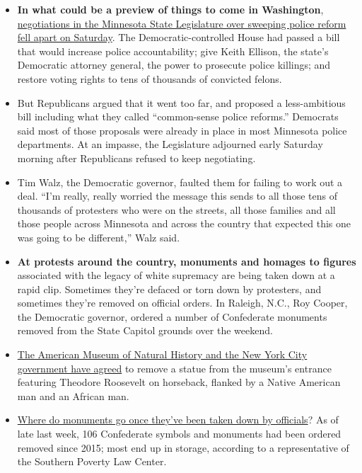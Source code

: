 \begin{itemize}
\item
  \textbf{In what could be a preview of things to come in Washington},
  \href{https://www.nytimes3xbfgragh.onion/2020/06/20/us/minnesota-police-george-floyd.html}{negotiations
  in the Minnesota State Legislature over sweeping police reform fell
  apart on Saturday}. The Democratic-controlled House had passed a bill
  that would increase police accountability; give Keith Ellison, the
  state's Democratic attorney general, the power to prosecute police
  killings; and restore voting rights to tens of thousands of convicted
  felons.
\item
  But Republicans argued that it went too far, and proposed a
  less-ambitious bill including what they called ``common-sense police
  reforms.'' Democrats said most of those proposals were already in
  place in most Minnesota police departments. At an impasse, the
  Legislature adjourned early Saturday morning after Republicans refused
  to keep negotiating.
\item
  Tim Walz, the Democratic governor, faulted them for failing to work
  out a deal. ``I'm really, really worried the message this sends to all
  those tens of thousands of protesters who were on the streets, all
  those families and all those people across Minnesota and across the
  country that expected this one was going to be different,'' Walz said.
\item
  \textbf{At protests around the country, monuments and homages to
  figures} associated with the legacy of white supremacy are being taken
  down at a rapid clip. Sometimes they're defaced or torn down by
  protesters, and sometimes they're removed on official orders. In
  Raleigh, N.C., Roy Cooper, the Democratic governor, ordered a number
  of Confederate monuments removed from the State Capitol grounds over
  the weekend.
\item
  \href{https://www.nytimes3xbfgragh.onion/2020/06/21/arts/design/roosevelt-statue-to-be-removed-from-museum-of-natural-history.html?auth=login-google\&smid=tw-share}{The
  American Museum of Natural History and the New York City government
  have agreed} to remove a statue from the museum's entrance featuring
  Theodore Roosevelt on horseback, flanked by a Native American man and
  an African man.
\item
  \href{https://www.nytimes3xbfgragh.onion/2020/06/18/us/confederate-statues-monuments-removal.html}{Where
  do monuments go once they've been taken down by officials}? As of late
  last week, 106 Confederate symbols and monuments had been ordered
  removed since 2015; most end up in storage, according to a
  representative of the Southern Poverty Law Center.
\end{itemize}

